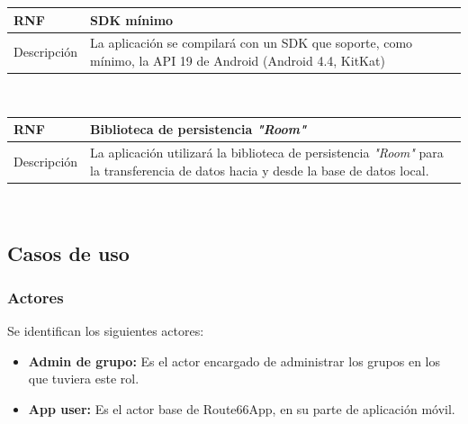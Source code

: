 \documentclass[twoside]{report}
\newcommand\addrow[2]{#1 &#2\\ }
\newcommand\addheading[2]{#1 &#2\\ \hline}
\newcommand\tabularhead{\begin{tabular}{lp{0.7\textwidth}}
\hline
}
\newenvironment{req}{\tabularhead}
{\hline\end{tabular}}
\begin{document}
\begin{req}
	\addheading{\textbf{RNF\arabic{nonFunctionalRequirements}}}{SDK mínimo}
	\addrow{Descripción}{La aplicación se compilará con un SDK que soporte, como mínimo, la API 19 de Android (Android 4.4, KitKat)\cite{androidversiondist}}
\end{req}\\

\begin{req}
	\addheading{\textbf{RNF\arabic{nonFunctionalRequirements}}}{Biblioteca de persistencia \textit{"Room"}}
	\addrow{Descripción}{La aplicación utilizará la biblioteca de persistencia \textit{"Room"} para la transferencia de datos hacia y desde la base de datos local.}
\end{req}\\

\subsection{Casos de uso}

\subsubsection{Actores}

Se identifican los siguientes actores:

\begin{itemize}
\item \textbf{Admin de grupo:} Es el actor encargado de administrar los grupos en los que tuviera este rol.
\item \textbf{App user:} Es el actor base de Route66App, en su parte de aplicación móvil.
\end{itemize}
\end{document}
